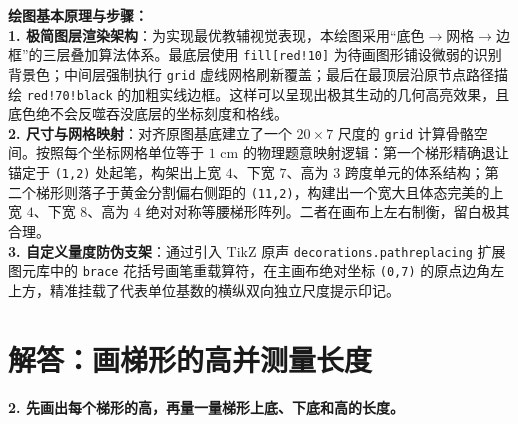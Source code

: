\documentclass[12pt, a4paper]{ctexrep}
\begin{document}
\vspace{0.6cm}

{\small\color{blue!70!black}
\textbf{绘图基本原理与步骤：}\\
\textbf{1. 极简图层渲染架构}：为实现最优教辅视觉表现，本绘图采用“底色$\to$网格$\to$边框”的三层叠加算法体系。最底层使用 \texttt{fill[red!10]} 为待画图形铺设微弱的识别背景色；中间层强制执行 \texttt{grid} 虚线网格刷新覆盖；最后在最顶层沿原节点路径描绘 \texttt{red!70!black} 的加粗实线边框。这样可以呈现出极其生动的几何高亮效果，且底色绝不会反噬吞没底层的坐标刻度和格线。\\
\textbf{2. 尺寸与网格映射}：对齐原图基底建立了一个 $20 \times 7$ 尺度的 \texttt{grid} 计算骨骼空间。按照每个坐标网格单位等于 $1\text{ cm}$ 的物理题意映射逻辑：第一个梯形精确退让锚定于 \texttt{(1,2)} 处起笔，构架出上宽 $4$、下宽 $7$、高为 $3$ 跨度单元的体系结构；第二个梯形则落子于黄金分割偏右侧距的 \texttt{(11,2)}，构建出一个宽大且体态完美的上宽 $4$、下宽 $8$、高为 $4$ 绝对对称等腰梯形阵列。二者在画布上左右制衡，留白极其合理。\\
\textbf{3. 自定义量度防伪支架}：通过引入 TikZ 原声 \texttt{decorations.pathreplacing} 扩展图元库中的 \texttt{brace} 花括号画笔重载算符，在主画布绝对坐标 \texttt{(0,7)} 的原点边角左上方，精准挂载了代表单位基数的横纵双向独立尺度提示印记。
}


\newpage

\section{解答：画梯形的高并测量长度}

\vspace{0.4cm}

\noindent\textbf{2. 先画出每个梯形的高，再量一量梯形上底、下底和高的长度。}

\vspace{0.8cm}
\end{document}
